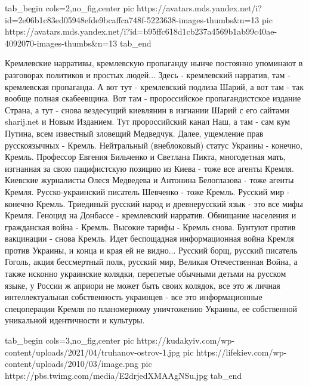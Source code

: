 \ifcmt
  tab_begin cols=2,no_fig,center
     pic https://avatars.mds.yandex.net/i?id=2e06b1c83ed05948efde9bcaffca748f-5223638-images-thumbs&n=13
		 pic https://avatars.mds.yandex.net/i?id=b95ffc618d1cb237a4569b1ab99c40ae-4092070-images-thumbs&n=13
  tab_end
\fi

Кремлевские нарративы, кремлевскую пропаганду нынче постоянно упоминают в
разговорах политиков и простых людей... Здесь - кремлевский нарратив, там -
кремлевская пропаганда.  А вот тут - кремлевский подлиза Шарий, а вот там - так
вообще полная скабеевщина. Вот там - пророссийское пропагандистское издание
Страна, а тут - снова вездесущий киевлянин в изгнании Шарий с его сайтами
sharij.net и Новым Изданием. Тут пророссийский канал Наш, а там - сам кум
Путина, всем известный зловещий Медведчук. Далее, ущемление прав русскоязычных
- Кремль. Нейтральный (внеблоковый) статус Украины - конечно, Кремль. Профессор
Евгения Бильченко и Светлана Пикта, многодетная мать, изгнанная за свою
пацифистскую позицию из Киева - тоже все агенты Кремля. Киевские журналисты Олеся Медведева и
Антонина Белоглазова - тоже агенты Кремля. Русско-украинский писатель Шевченко
- тоже Кремль. Русский мир - конечно Кремль. Триединый русский народ и
древнерусский язык - это все мифы Кремля. Геноцид на Донбассе - кремлевский
нарратив.  Обнищание населения и гражданская война - Кремль. Высокие тарифы -
Кремль снова. Бунтуют против вакцинации - снова Кремль. Идет беспощадная
информационная война Кремля против Украины, и конца и края ей не видно...
Русский борщ, русский писатель Гоголь, акция бессмертный полк, русский мир,
Великая Отечественная Война, а также исконно украинские колядки, перепетые
обычными детьми на русском языке, у России ж априори не может быть своих
колядок, все это ж личная интеллектуальная собственность украинцев - все это
информационные спецоперации Кремля по планомерному уничтожению Украины, ее
собственной уникальной идентичности и культуры.

\ifcmt
  tab_begin cols=3,no_fig,center
     pic https://kudakyiv.com/wp-content/uploads/2021/04/truhanov-ostrov-1.jpg
		 pic https://lifekiev.com/wp-content/uploads/2010/03/image.png
		 pic https://pbs.twimg.com/media/E2drjedXMAAgNSu.jpg
  tab_end
\fi

